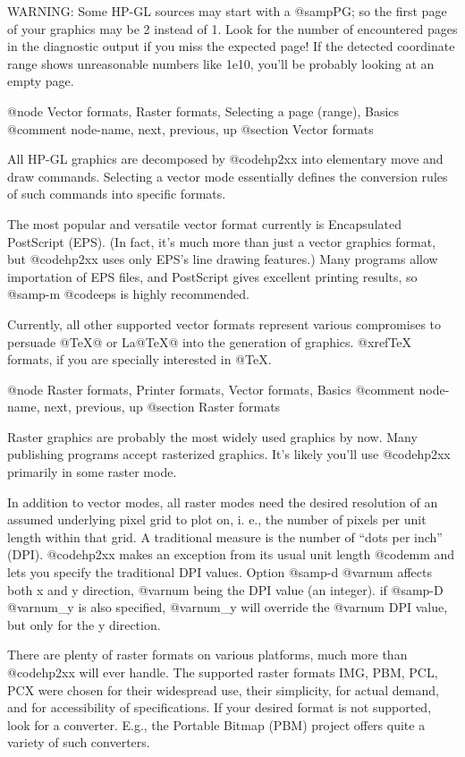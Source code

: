 WARNING: Some HP-GL sources may start with a @samp{PG;} so the first
page of your graphics may be 2 instead of 1. Look for the number of
encountered pages in the diagnostic output if you miss the expected page!
If the detected coordinate range shows unreasonable numbers like 1e10,
you'll be probably looking at an empty page.




@node Vector formats, Raster formats, Selecting a page (range), Basics
@comment  node-name,  next,  previous,  up
@section Vector formats

All HP-GL graphics are decomposed by @code{hp2xx} into elementary
move and draw commands. Selecting a vector mode essentially defines the
conversion rules of such commands into specific formats.

The most popular and versatile vector format currently is
Encapsulated PostScript (EPS). (In fact, it's much more than just a
vector graphics format, but @code{hp2xx} uses only EPS's line drawing
features.) Many programs allow importation of EPS files, and PostScript
gives excellent printing results, so @samp{-m @code{eps}} is highly
recommended.

Currently, all other supported vector formats represent various compromises
to persuade @TeX{}@ or La@TeX{}@ into the generation of graphics.
@xref{TeX formats}, if you are specially interested in @TeX{}.



@node Raster formats, Printer formats, Vector formats, Basics
@comment  node-name,  next,  previous,  up
@section Raster formats

Raster graphics are probably the most widely used graphics by now.
Many publishing programs accept rasterized graphics. It's likely you'll
use @code{hp2xx} primarily in some raster mode.

In addition to vector modes, all raster modes need the desired resolution
of an assumed underlying pixel grid to plot on, i. e., the number of
pixels per unit length within that grid.
A traditional measure is the number of ``dots per inch'' (DPI).
@code{hp2xx} makes an exception from its usual unit length @code{mm} and
lets you specify the traditional DPI values.
Option @samp{-d @var{num}} affects both x and y direction, @var{num} being
the DPI value (an integer). if @samp{-D @var{num_y}} is also specified,
@var{num_y} will override the @var{num} DPI value, but only for the y
direction.

There are plenty of raster formats on various platforms, much more
than @code{hp2xx} will ever handle. The supported raster formats
IMG, PBM, PCL, PCX were chosen for their widespread use, their simplicity,
for actual demand, and for accessibility of specifications.
If your desired format is not supported, look for a converter. E.g., the
Portable Bitmap (PBM) project offers quite a variety of such converters.

